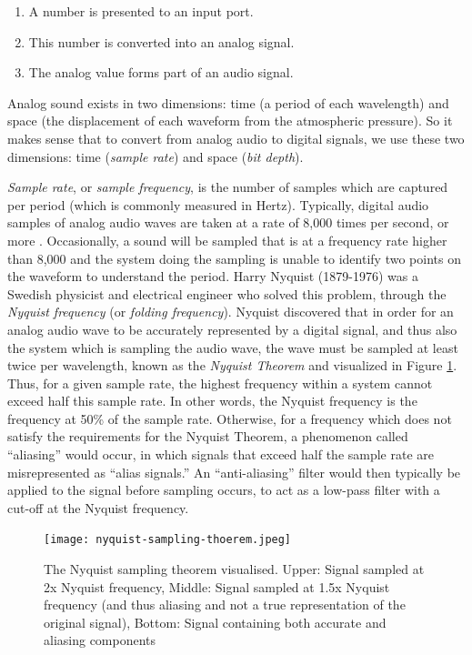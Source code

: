 \begin{enumerate}
	\item A number is presented to an input port.
	\item This number is converted into an analog signal.
	\item The analog value forms part of an audio signal.
\end{enumerate}

Analog sound exists in two dimensions: time (a period of each wavelength) and space (the displacement of each waveform from the atmospheric pressure). So it makes sense that to convert from analog audio to digital signals, we use these two dimensions: time (\textit{sample rate}) and space (\textit{bit depth}). 

\textit{Sample rate}, or \textit{sample frequency}, is the number of samples which are captured per period (which is commonly measured in Hertz). Typically, digital audio samples of analog audio waves are taken at a rate of 8,000 times per second, or more \cite{Zjalic_2021}. Occasionally, a sound will be sampled that is at a frequency rate higher than 8,000 and the system doing the sampling is unable to identify two points on the waveform to understand the period. Harry Nyquist (1879-1976) was a Swedish physicist and electrical engineer who solved this problem, through the \textit{Nyquist frequency} (or \textit{folding frequency}). Nyquist discovered that in order for an analog audio wave to be accurately represented by a digital signal, and thus also the system which is sampling the audio wave, the wave must be sampled at least twice per wavelength, known as the \textit{Nyquist Theorem} \cite{Zjalic_2021} and visualized in Figure \ref{fig:nyquist-sampling-theorem}. Thus, for a given sample rate, the highest frequency within a system cannot exceed half this sample rate. In other words, the Nyquist frequency is the frequency at 50\% of the sample rate. Otherwise, for a frequency which does not satisfy the requirements for the Nyquist Theorem, a phenomenon called ``aliasing'' would occur, in which signals that exceed half the sample rate are misrepresented as ``alias signals.'' An ``anti-aliasing'' filter would then typically be applied to the signal before sampling occurs, to act as a low-pass filter with a cut-off at the Nyquist frequency.


\begin{figure}[ht]
  \centering
  \texttt{[image: nyquist-sampling-thoerem.jpeg]}
  \caption{The Nyquist sampling theorem visualised. Upper: Signal sampled at 2x Nyquist frequency, Middle: Signal sampled at 1.5x Nyquist frequency (and thus aliasing and not a true representation of the original signal), Bottom: Signal containing both accurate and aliasing components}\cite{Zjalic_2021}
  \label{fig:nyquist-sampling-theorem}
\end{figure}


